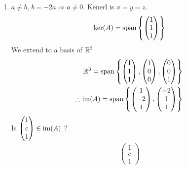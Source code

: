 \documentclass{article}
\numberwithin{equation}{section}
\begin{document}
\begin{eg}
\begin{enumerate}[label=(\arabic*)]
\begin{enumerate}
            \item $a \neq b$, $b = -2a \Rightarrow a \neq 0$. Kenerl is $x = y = z$.
            \[
                \ker(A) = \operatorname{span} \left\{ \begin{pmatrix}
                    1 \\ 1 \\ 1
                \end{pmatrix} \right\}
            \]
            We extend to a basis of $\mathbb{R}^3$
            \begin{align*}
                \mathbb{R}^3 = \operatorname{span} \left\{ 
                    \begin{pmatrix}
                        1 \\ 1 \\ 1
                    \end{pmatrix},
                    \begin{pmatrix}
                        1 \\ 0 \\ 0
                    \end{pmatrix},
                    \begin{pmatrix}
                        0 \\ 0 \\ 1
                    \end{pmatrix}
                 \right\} \\
                \therefore \operatorname{im}(A) = \operatorname{span} \left\{ 
                    \begin{pmatrix}
                        1 \\ -2 \\ 1
                    \end{pmatrix},
                    \begin{pmatrix}
                        -2 \\ 1 \\ 1
                    \end{pmatrix}
                 \right\}
            \end{align*}
            Is $\begin{pmatrix}
                1 \\ c \\ 1
            \end{pmatrix} \in \operatorname{im}(A)$ ? 
            \begin{align*}
                \begin{pmatrix}
                    1 \\ c \\ 1

\end{pmatrix}
\end{align*}
\end{enumerate}
\end{enumerate}
\end{eg}
\end{document}
